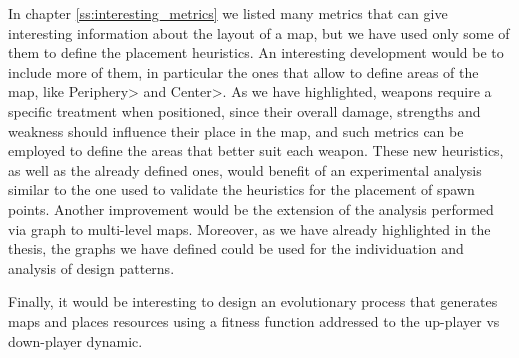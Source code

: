 \par

In chapter \ref{ss:interesting_metrics} we listed many metrics that can give interesting information about the layout of a map, but we have used only some of them to define the placement heuristics. An interesting development would be to include more of them, in particular the ones that allow to define areas of the map, like \<Periphery> and \<Center>. As we have highlighted, weapons require a specific treatment when positioned, since their overall damage, strengths and weakness should influence their place in the map, and such metrics can be employed to define the areas that better suit each weapon. These new heuristics, as well as the already defined ones, would benefit of an experimental analysis similar to the one used to validate the heuristics for the placement of spawn points. Another improvement would be the extension of the analysis performed via graph to multi-level maps. Moreover, as we have already highlighted in the thesis, the graphs we have defined could be used for the individuation and analysis of design patterns.

\par

Finally, it would be interesting to design an evolutionary process that generates maps and places resources using a fitness function addressed to the up-player vs down-player dynamic.